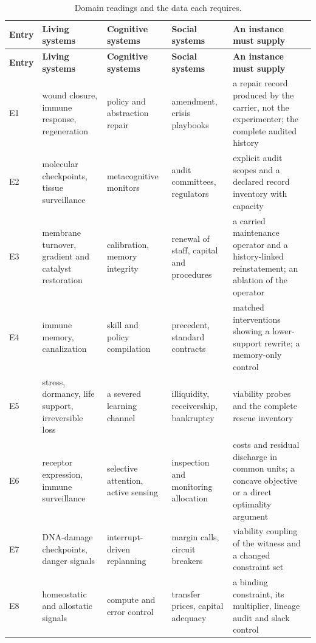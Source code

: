 {\footnotesize
\begin{longtable}{@{}>{\raggedright\arraybackslash}p{1.0cm}>{\raggedright\arraybackslash}p{3.1cm}>{\raggedright\arraybackslash}p{2.9cm}>{\raggedright\arraybackslash}p{3.1cm}>{\raggedright\arraybackslash}p{4.1cm}@{}}
\caption{Domain readings and the data each requires.}\label{tab:domains}\\
\toprule
\textbf{Entry} & \textbf{Living systems} & \textbf{Cognitive systems} & \textbf{Social systems} &
\textbf{An instance must supply} \\
\midrule
\endfirsthead
\toprule
\textbf{Entry} & \textbf{Living systems} & \textbf{Cognitive systems} & \textbf{Social systems} &
\textbf{An instance must supply} \\
\midrule
\endhead
\bottomrule
\endfoot
E1 & wound closure, immune response, regeneration & policy and abstraction repair & amendment,
crisis playbooks & a repair record produced by the carrier, not the experimenter; the complete
audited history \\
E2 & molecular checkpoints, tissue surveillance & metacognitive monitors & audit committees,
regulators & explicit audit scopes and a declared record inventory with capacity \\
E3 & membrane turnover, gradient and catalyst restoration & calibration, memory integrity & renewal
of staff, capital and procedures & a carried maintenance operator and a history-linked reinstatement;
an ablation of the operator \\
E4 & immune memory, canalization & skill and policy compilation & precedent, standard contracts &
matched interventions showing a lower-support rewrite; a memory-only control \\
E5 & stress, dormancy, life support, irreversible loss & a severed learning channel & illiquidity,
receivership, bankruptcy & viability probes and the complete rescue inventory \\
E6 & receptor expression, immune surveillance & selective attention, active sensing & inspection
and monitoring allocation & costs and residual discharge in common units; a concave objective or a
direct optimality argument \\
E7 & DNA-damage checkpoints, danger signals & interrupt-driven replanning & margin calls, circuit
breakers & viability coupling of the witness and a changed constraint set \\
E8 & homeostatic and allostatic signals & compute and error control & transfer prices, capital
adequacy & a binding constraint, its multiplier, lineage audit and slack control \\

\end{longtable}}
